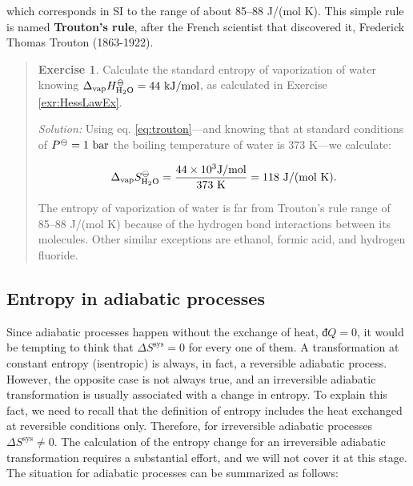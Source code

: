 \documentclass[
]{book}
\theoremstyle{definition}
\theoremstyle{definition}
\theoremstyle{definition}
\newtheorem{exercise}{Exercise}[chapter]
\theoremstyle{remark}
\begin{document}
which corresponds in SI to the range of about 85--88 J/(mol K). This simple rule is named \textbf{Trouton's rule}, after the French scientist that discovered it, Frederick Thomas Trouton (1863-1922).

\begin{quote}
\begin{exercise}
\protect\hypertarget{exr:troutonex}{}{\label{exr:troutonex} }Calculate the standard entropy of vaporization of water knowing \(\Delta_{\mathrm{vap}} H_{\mathrm{H}_2\mathrm{O}}^{-\kern-6pt{\ominus}\kern-6pt-}= 44 \  \text{kJ/mol}\), as calculated in Exercise \ref{exr:HessLawEx}.

\emph{Solution:} Using eq. \eqref{eq:trouton}---and knowing that at standard conditions of \(P^{-\kern-6pt{\ominus}\kern-6pt-}= 1 \  \text{bar}\) the boiling temperature of water is 373 K---we calculate:

\begin{equation}
\Delta_{\mathrm{vap}} S_{\mathrm{H}_2\mathrm{O}}^{-\kern-6pt{\ominus}\kern-6pt-}= \frac{44 \times 10^3 \text{J/mol}}{373 \ \text{K}} = 118 \  \text{J/(mol K)}.
\label{eq:trouton1}
\end{equation}

The entropy of vaporization of water is far from Trouton's rule range of 85--88 J/(mol K) because of the hydrogen bond interactions between its molecules. Other similar exceptions are ethanol, formic acid, and hydrogen fluoride.
\end{exercise}
\end{quote}

\hypertarget{entropy-in-adiabatic-processes}{%
\subsection{Entropy in adiabatic processes}\label{entropy-in-adiabatic-processes}}

Since adiabatic processes happen without the exchange of heat, \(đQ=0\), it would be tempting to think that \(\Delta S^{\mathrm{sys}} = 0\) for every one of them. A transformation at constant entropy (isentropic) is always, in fact, a reversible adiabatic process. However, the opposite case is not always true, and an irreversible adiabatic transformation is usually associated with a change in entropy. To explain this fact, we need to recall that the definition of entropy includes the heat exchanged at reversible conditions only. Therefore, for irreversible adiabatic processes \(\Delta S^{\mathrm{sys}} \neq 0\). The calculation of the entropy change for an irreversible adiabatic transformation requires a substantial effort, and we will not cover it at this stage. The situation for adiabatic processes can be summarized as follows:
\end{document}
